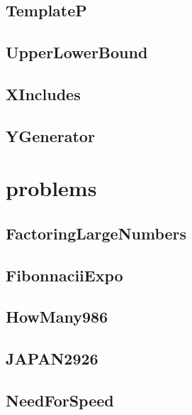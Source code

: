 \subsection{ TemplateP}
\raggedbottom
\hrulefill
\subsection{ UpperLowerBound}
\raggedbottom
\hrulefill
\subsection{ XIncludes}
\raggedbottom
\hrulefill
\subsection{ YGenerator}
\raggedbottom
\hrulefill

\section{problems}
\subsection{ FactoringLargeNumbers}
\raggedbottom
\hrulefill
\subsection{ FibonnaciiExpo}
\raggedbottom
\hrulefill
\subsection{ HowMany986}
\raggedbottom
\hrulefill
\subsection{ JAPAN2926}
\raggedbottom
\hrulefill
\subsection{ NeedForSpeed}
\raggedbottom
\hrulefill

